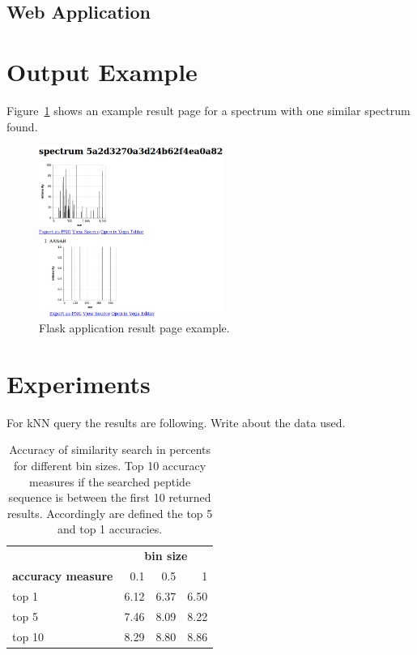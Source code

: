 \documentclass[a4paper,10pt,twocolumn]{article}
\begin{document}
\subsection{Web Application}

\section{Output Example}

Figure~\ref{fig:sample} shows an example result page for a spectrum with 
one similar spectrum found.

\begin{figure}[H]
    \begin{center}
        \includegraphics[width=6cm]{img/output-sample}
    \end{center}
    \caption{Flask application result page example.}
    \label{fig:sample}
\end{figure}

\section{Experiments}

For kNN query the results are following. Write about the data used.

\begin{table}[H]
    \begin{center}
        \label{table:TODO}
        \begin{tabular}{l|rrr}
            & \multicolumn{3}{c}{\textbf{bin size}} \\
            \textbf{accuracy measure} & 0.1 & 0.5 & 1 \\
            \hline
            top 1 & 6.12 & 6.37 & 6.50 \\
            top 5 & 7.46 & 8.09 & 8.22 \\
            top 10 & 8.29 & 8.80 & 8.86 \\
        \end{tabular}
        \caption{
            Accuracy of similarity search in percents for different bin sizes.
            Top 10 accuracy measures if the searched peptide sequence is between
            the first 10 returned results. Accordingly are defined the top 5
            and top 1 accuracies.
        }
    \end{center}
\end{table}
\end{document}
